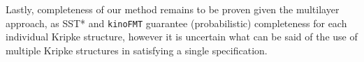 Lastly, completeness of our method remains to be proven given the multilayer approach, as SST* and \texttt{kinoFMT} guarantee (probabilistic) completeness for each individual Kripke structure, however it is uncertain what can be said of the use of multiple Kripke structures in satisfying a single specification.